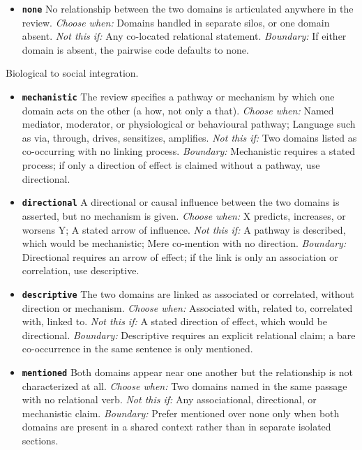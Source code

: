 \documentclass[11pt]{article}
\begin{document}
\begin{description}
\begin{itemize}[leftmargin=1.3em,itemsep=2pt,topsep=2pt]
  \item \textbf{\texttt{none}} No relationship between the two domains is articulated anywhere in the review. {\small \textit{Choose when:} Domains handled in separate silos, or one domain absent. \textit{Not this if:} Any co-located relational statement. \textit{Boundary:} If either domain is absent, the pairwise code defaults to none.}
  \end{itemize}
\item[\texttt{integration\_bio\_social}] Biological to social integration.
  \begin{itemize}[leftmargin=1.3em,itemsep=2pt,topsep=2pt]
  \item \textbf{\texttt{mechanistic}} The review specifies a pathway or mechanism by which one domain acts on the other (a how, not only a that). {\small \textit{Choose when:} Named mediator, moderator, or physiological or behavioural pathway; Language such as via, through, drives, sensitizes, amplifies. \textit{Not this if:} Two domains listed as co-occurring with no linking process. \textit{Boundary:} Mechanistic requires a stated process; if only a direction of effect is claimed without a pathway, use directional.}
  \item \textbf{\texttt{directional}} A directional or causal influence between the two domains is asserted, but no mechanism is given. {\small \textit{Choose when:} X predicts, increases, or worsens Y; A stated arrow of influence. \textit{Not this if:} A pathway is described, which would be mechanistic; Mere co-mention with no direction. \textit{Boundary:} Directional requires an arrow of effect; if the link is only an association or correlation, use descriptive.}
  \item \textbf{\texttt{descriptive}} The two domains are linked as associated or correlated, without direction or mechanism. {\small \textit{Choose when:} Associated with, related to, correlated with, linked to. \textit{Not this if:} A stated direction of effect, which would be directional. \textit{Boundary:} Descriptive requires an explicit relational claim; a bare co-occurrence in the same sentence is only mentioned.}
  \item \textbf{\texttt{mentioned}} Both domains appear near one another but the relationship is not characterized at all. {\small \textit{Choose when:} Two domains named in the same passage with no relational verb. \textit{Not this if:} Any associational, directional, or mechanistic claim. \textit{Boundary:} Prefer mentioned over none only when both domains are present in a shared context rather than in separate isolated sections.}

\end{itemize}
\end{description}
\end{document}
